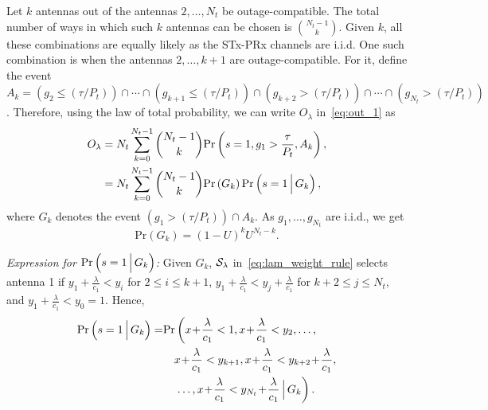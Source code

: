 \documentclass[journal]{IEEEtran}
\newcommand{\brac}[1]{\left({#1}\right)}
\newcommand{\prob}[1]{\text{Pr}\brac{#1}}
\newcommand{\Given}{\Big\arrowvert}
\newcommand{\nck}[2]{\binom{#1}{#2}}
\newcommand{\setA}{A}
\newcommand{\setAk}{\setA_{k}}
\newcommand{\setG}{G}
\newcommand{\setGk}{\setG_k}
\newcommand{\lam}{\lambda}
\newcommand{\Nt}{{N_t}}
\newcommand{\Pt}{{P_t}}
\newcommand{\puch}{g}
\newcommand{\gk}[1]{{\puch_{#1}}}
\newcommand{\itau}{\tau}
\newcommand{\cone}{c_{1}}
\newcommand{\out}{O}
\newcommand{\taubypt}{\frac{\itau}{\Pt}}
\newcommand{\taubyptinl}{{\itau}/{\Pt}}
\newcommand{\gkgrtaubypt}[1]{{\gk{#1}}>\taubypt}
\newcommand{\gkgrtaubyptinl}[1]{{\gk{#1}}>\left( \taubyptinl \right) }
\newcommand{\gklttaubyptinl}[1]{{\gk{#1}}\leq\left( \taubyptinl \right) }
\newcommand{\lambycone}{\frac{\lam}{\cone}}
\newcommand{\yk}[1]{y_{#1}}
\newcommand{\ykplambym}[1]{\yk{#1}+\lambycone}
\newcommand{\ykplambymcomp}[1]{\yk{#1}\!+\!\lambycone}
\newcommand{\xplambymcomp}{x\!+\!\lambycone}
\newcommand{\un}{U}
\newcommand{\callamrule}{{\cal S_{{\lam}}}}
\newcommand{\outlam}{\out_{\lam}}
\begin{document}
Let $k$ antennas out of the antennas $2,\ldots,\Nt$ be outage-compatible. The total number of ways in which such $k$ antennas can be chosen is $\nck{\Nt-1}{k}$. Given $k$, all these combinations are equally likely as the STx-PRx channels are i.i.d. One such combination is when the antennas $2,\ldots,k+1$ are outage-compatible. For it, define the event   $\setAk=\left(\gklttaubyptinl{2}\right)\cap\cdots\cap\left(\gklttaubyptinl{k+1}\right)\cap\left( \gkgrtaubyptinl{k+2}\right)\cap\cdots\cap\left(\gkgrtaubyptinl{\Nt}\right)$. Therefore, using the law of total probability, we can write $\outlam$ in~\eqref{eq:out_1} as
%
\begin{align}
\outlam &=\Nt\sum_{k=0}^{\Nt-1}\nck{\Nt-1}{k} \text{Pr}\brac{s = 1,\gkgrtaubypt{1},\setAk}, \\
&=\Nt\sum_{k=0}^{\Nt-1}\nck{\Nt-1}{k}  \text{Pr}\brac{\setGk} \text{Pr}\brac{s = 1\Given \setGk},
\label{eq:out_3}
\end{align}
%
where $\setGk$ denotes the event  $\left(\gkgrtaubyptinl{1}\right)\cap\setAk $. As $\gk{1},\ldots,\gk{\Nt}$ are i.i.d., we get 
%
\begin{equation}
\label{eq:pr_Gk}
\prob{\setGk} = \left(1-\un\right)^k\un^{\Nt-k}.
\end{equation}
%

{\em Expression for $\prob{s = 1\Given\setGk}$:} Given $\setGk$, $\callamrule$ in~\eqref{eq:lam_weight_rule} selects antenna 1 if $\ykplambym{1}<\yk{i}$ for $2\leq i \leq k+1$,  $\ykplambym{1}<\ykplambym{j}$ for $k+2\leq j \leq \Nt$, and $\ykplambym{1}<\yk{0}=1$.  Hence,
%
%
\begin{align}
\label{eq:out_5}
\text{Pr}\left(s =  1  \Given  \setGk \right)=&\text{Pr}\left(\xplambymcomp  <  1, \xplambymcomp < \yk{2},\ldots, \right. \nonumber\\
&\quad\xplambymcomp<\yk{k+1},
\xplambymcomp<\ykplambymcomp{k+2}, \nonumber\\
&\quad\left. \ldots,\xplambymcomp < \ykplambymcomp{\Nt}\Given\setGk\right).
\end{align}
\end{document}
